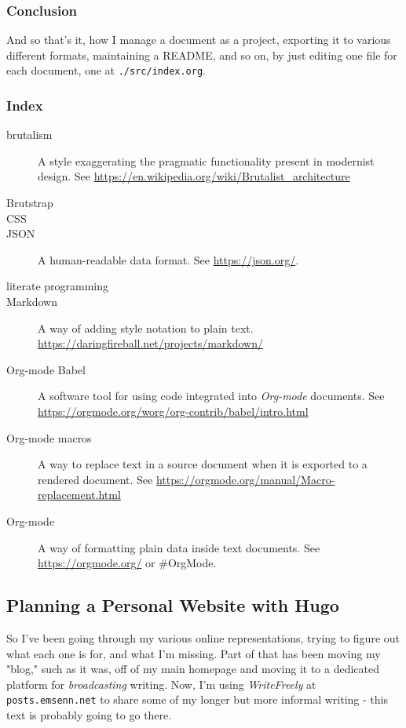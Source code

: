 \documentclass[11pt]{article}
\begin{document}
\subsubsection*{Conclusion}
\label{sec:orgc9b76bd}
And so that's it, how I manage a document as a project, exporting it
to various different formats, maintaining a README, and so on, by just
editing one file for each document, one at \texttt{./src/index.org}.
\subsubsection*{Index}
\label{sec:orgb1e449d}
\begin{description}
\item[{brutalism}] A style exaggerating the pragmatic functionality present in modernist design. See \href{https://en.wikipedia.org/wiki/Brutalist\_architecture}{https://en.wikipedia.org/wiki/Brutalist\_architecture}
\item[{Brutstrap}]

\item[{CSS}]

\item[{JSON}] A human-readable data format. See \href{https://json.org/}{https://json.org/}.
\item[{literate programming}]

\item[{Markdown}] A way of adding style notation to plain text. \url{https://daringfireball.net/projects/markdown/}
\item[{Org-mode Babel}] A software tool for using code integrated into \emph{Org-mode} documents. See \href{https://orgmode.org/worg/org-contrib/babel/intro.html}{https://orgmode.org/worg/org-contrib/babel/intro.html}
\item[{Org-mode macros}] A way to replace text in a source document when it is exported to a rendered document. See \href{https://orgmode.org/manual/Macro-replacement.html}{https://orgmode.org/manual/Macro-replacement.html}
\item[{Org-mode}] A way of formatting plain data inside text documents. See \href{https://orgmode.org/}{https://orgmode.org/}  or \#OrgMode.
\end{description}
\subsection*{Planning a Personal Website with Hugo}
\label{sec:orgfaa5a66}
So I've been going through my various online representations, trying
to figure out what each one is for, and what I'm missing. Part of that
has been moving my "blog," such as it was, off of my main homepage and
moving it to a dedicated platform for \emph{broadcasting} writing. Now, I'm
using \emph{WriteFreely} at \texttt{posts.emsenn.net} to share some of my longer
but more informal writing - this text is probably going to go there.
\end{document}
